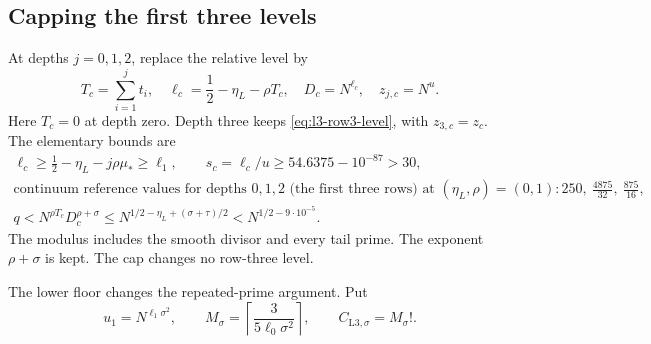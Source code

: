 \subsection{Capping the first three levels}

At depths $j=0,1,2$, replace the relative level by
\begin{equation}\label{eq:l3-cap}
 T_c=\sum_{i=1}^jt_i,\quad
 \ell_c=\frac12-\eta_L-\rho T_c,\quad
 D_c=N^{\ell_c},\quad z_{j,c}=N^u.
\end{equation}
Here $T_c=0$ at depth zero.
Depth three keeps \eqref{eq:l3-row3-level}, with $z_{3,c}=z_c$.
The elementary bounds are
\begin{equation}\label{eq:l3-cap-margins}
\begin{gathered}
 \ell_c\ge\frac12-\eta_L-j\rho\mu_*\ge\ell_1,
 \qquad s_c=\ell_c/u\ge54.6375-10^{-87}>30,\\
 \text{continuum reference values for depths }0,1,2\text{ (the first three rows)}
 \text{ at }(\eta_L,\rho)=(0,1):
       250,\ \frac{4875}{32},\ \frac{875}{16},\\
 q<N^{\rho T_c}D_c^{\rho+\sigma}
   \le N^{1/2-\eta_L+(\sigma+\tau)/2}
   <N^{1/2-9\cdot10^{-5}}.
\end{gathered}
\end{equation}
The modulus includes the smooth divisor and every tail prime.
The exponent $\rho+\sigma$ is kept.
The cap changes no row-three level.

The lower floor changes the repeated-prime argument.
Put
\begin{equation}\label{eq:l3-rough-floor}
 u_1=N^{\ell_1\sigma^2},\qquad
 M_\sigma=\left\lceil\frac3{5\ell_0\sigma^2}\right\rceil,
 \qquad C_{\mathrm{L3},\sigma}=M_\sigma!.
\end{equation}
